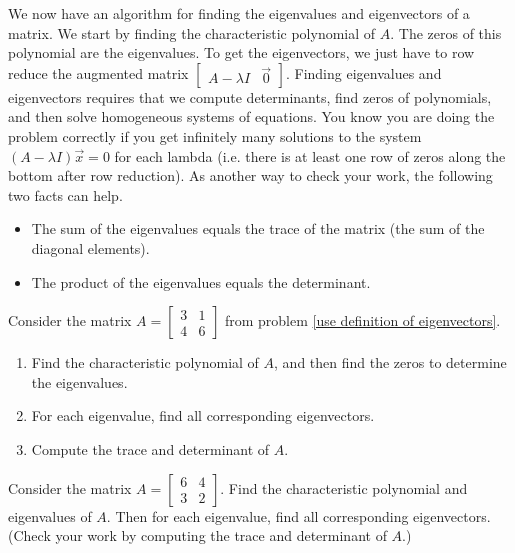 We now have an algorithm for finding the eigenvalues and eigenvectors of a matrix.  We start by finding the characteristic polynomial of $A$. The zeros of this polynomial are the eigenvalues.  To get the eigenvectors, we just have to row reduce the augmented matrix 
$\begin{bmatrix}A-\lambda I&\vec 0\end{bmatrix}$.
Finding eigenvalues and eigenvectors requires that we compute determinants, find zeros of polynomials, and then solve homogeneous systems of equations. You know you are doing the problem correctly if you get infinitely many solutions to the system $(A-\lambda I)\vec x=0$ for each lambda (i.e. there is at least one row of zeros along the bottom after row reduction).
As another way to check your work, the following two facts can help.
\begin{itemize}
	\item {}The sum of the eigenvalues equals the trace of the matrix (the sum of the diagonal elements).
	\item The product of the eigenvalues equals the determinant.
\end{itemize}




\begin{problem}
Consider the matrix 
$A=
\begin{bmatrix}
 3 & 1 \\
 4 & 6
\end{bmatrix}
$
from problem  \ref{use definition of eigenvectors}. 
\begin{enumerate}
 \item Find the characteristic polynomial of $A$, and then find the zeros to determine the eigenvalues.
 \item For each eigenvalue, find all corresponding eigenvectors.
 \item Compute the trace and determinant of $A$.
\end{enumerate}

\end{problem}


\begin{problem}
Consider the matrix 
$
A=
\begin{bmatrix}
 6 & 4  \\
 3 & 2  
\end{bmatrix}
$. 
Find the characteristic polynomial and eigenvalues of $A$. 
Then for each eigenvalue, find all corresponding eigenvectors.
(Check your work by computing the trace and determinant of $A$.)
\end{problem}



